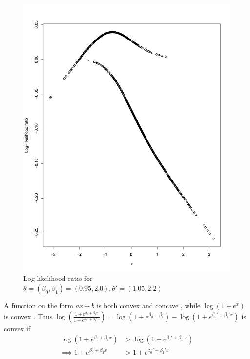 \begin{figure}
    \centering
    \includegraphics[scale = 0.7]{figures/loglik_ratio_logist2.pdf}
    \caption{Log-likelihood ratio for $\theta = \left(\beta_0, \beta_1\right) = \left(0.95, 2.0\right), \theta' = \left(1.05, 2.2\right)$}
    \label{fig:my_label}
\end{figure}{
A function on the form $ax + b$ is both convex and concave , while $\log\left(1 + e^x\right)$ is convex . 
Thus $\log\left(\frac{1 + e^{\beta_0 + \beta_1 x}}{1 + e^{\beta_0' + \beta_1'x}}\right) = \log\left(1 + e^{\beta_0 + \beta_1}\right) - \log\left(1+ e^{ \beta_0' + \beta_1'x}\right)$ is convex if 
\begin{equation*}
\begin{split}
    \log\left(1 + e^{\beta_0 + \beta_1x}\right) &> \log\left(1 + e^{\beta_0' + \beta_1' x}\right)  \\
    \implies 1 + e^{\beta_0 + \beta_1x} &> 1 + e^{\beta_0' + \beta_1'x} \\

\end{split}
\end{equation*}}
